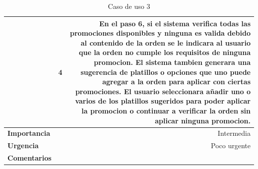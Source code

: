 \documentclass[conference]{IEEEtran}
\begin{document}
\begin{table}[H]
\begin{adjustbox}{width=0.42\textwidth}
\begin{tabular}{|p{11.215em}|r|r|}
\cmidrule{2-3}    \multicolumn{1}{|c|}{} & \multicolumn{1}{c|}{4} & \multicolumn{1}{p{32em}|}{En el paso 6, si el sistema verifica todas las promociones disponibles y ninguna es valida debido al contenido de la orden se le indicara al usuario que la orden no cumple los requisitos de ninguna promocion. El sistema tambien generara una sugerencia de platillos o opciones que uno puede agregar a la orden para aplicar con ciertas promociones. El usuario seleccionara  añadir uno o varios de los platillos sugeridos para poder aplicar la promocion o continuar a verificar la orden sin aplicar ninguna promocion.} \\
    \midrule
    \textbf{Importancia} & \multicolumn{2}{p{37.43em}|}{Intermedia} \\
    \midrule
    \textbf{Urgencia} & \multicolumn{2}{p{37.43em}|}{Poco urgente} \\
    \midrule
    \textbf{Comentarios} & \multicolumn{2}{r|}{} \\
    \bottomrule
    \end{tabular}%
    \end{adjustbox}
    \vspace{0.2cm}
    \caption{Caso de uso 3}
  \label{tab:addlabel}%
\end{table}%
\end{document}
